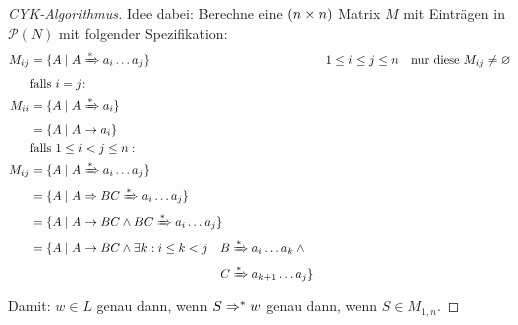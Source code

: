 {\begin{proof}[CYK-Algorithmus]
		Idee dabei: Berechne eine $(n\times n)$ Matrix $M$ mit Einträgen in $\mathcal{P}(N)$ mit folgender Spezifikation:
	\begin{align*}
		M_{ij} &= \{ A \mid A\xRightarrow{*} a_i\dots a_j \} && 1\leq i\leq j\leq n \quad\text{nur diese }M_{ij}\neq \varnothing\\
		& \text{falls $i=j$:}\\
		M_{ii} &= \{ A \mid A\xRightarrow{*} a_i\}\\
		&= \{A \mid A\-> a_i \} \\
		&\text{falls }1\leq i<j\leq n:\\
		M_{ij} &= \{ A \mid A\xRightarrow{*} a_i\dots a_j \}\\
		&= \{ A \mid A\=> BC \xRightarrow{*} a_i\dots a_j \}\\
		&= \{ A \mid A\-> BC \land BC \xRightarrow{*} a_i\dots a_j \}\\
		&= \{ A \mid A\-> BC \land \exists k: i\leq k<j\quad 
			\begin{aligned}[t]
				B &\xRightarrow{*} a_i\dots a_k \land{}\\
				C &\xRightarrow{*} a_{k+1}\dots a_j \}
			\end{aligned}\\
	\end{align*}
	Damit: $w\in L$ genau dann, wenn $S \=>^* w$ genau dann, wenn $S \in M_{1,n}$.
	

\end{proof}}
